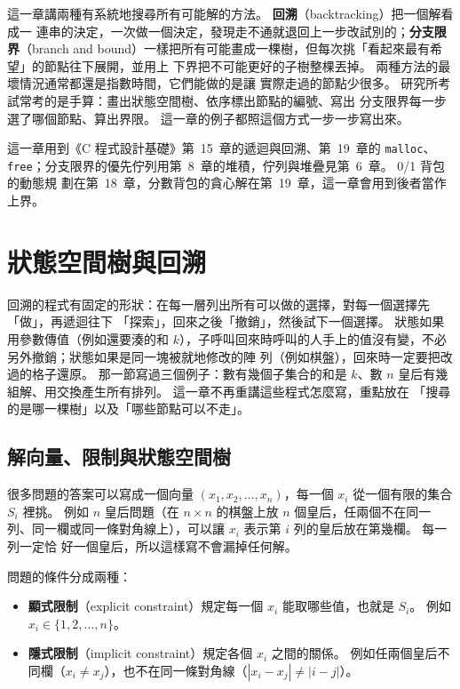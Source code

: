 這一章講兩種有系統地搜尋所有可能解的方法。 \textbf{回溯}（backtracking）把一個解看成一
連串的決定，一次做一個決定，發現走不通就退回上一步改試別的；\textbf{分支限界}（branch
and bound）一樣把所有可能畫成一棵樹，但每次挑「看起來最有希望」的節點往下展開，並用上
下界把不可能更好的子樹整棵丟掉。 兩種方法的最壞情況通常都還是指數時間，它們能做的是讓
實際走過的節點少很多。 研究所考試常考的是手算：畫出狀態空間樹、依序標出節點的編號、寫出
分支限界每一步選了哪個節點、算出界限。 這一章的例子都照這個方式一步一步寫出來。

這一章用到《C 程式設計基礎》第~15~章的遞迴與回溯、第~19~章的 \texttt{malloc}、
\texttt{free}；分支限界的優先佇列用第~8~章的堆積，佇列與堆疊見第~6~章。 0/1 背包的動態規
劃在第~18~章，分數背包的貪心解在第~19~章，這一章會用到後者當作上界。

\section{狀態空間樹與回溯}
\label{sec:bk-tree}

\begin{cbookrecap}[第~15~章 15.15 節]
回溯的程式有固定的形狀：在每一層列出所有可以做的選擇，對每一個選擇先「做」，再遞迴往下
「探索」，回來之後「撤銷」，然後試下一個選擇。 狀態如果用參數傳值（例如還要湊的和
$k$），子呼叫回來時呼叫的人手上的值沒有變，不必另外撤銷；狀態如果是同一塊被就地修改的陣
列（例如棋盤），回來時一定要把改過的格子還原。 那一節寫過三個例子：數有幾個子集合的和是
$k$、數 $n$ 皇后有幾組解、用交換產生所有排列。 這一章不再重講這些程式怎麼寫，重點放在
「搜尋的是哪一棵樹」以及「哪些節點可以不走」。
\end{cbookrecap}

\subsection{解向量、限制與狀態空間樹}

很多問題的答案可以寫成一個向量 $(x_1, x_2, \ldots, x_n)$，每一個 $x_i$ 從一個有限的集合
$S_i$ 裡挑。 例如 $n$ 皇后問題（在 $n \times n$ 的棋盤上放 $n$ 個皇后，任兩個不在同一
列、同一欄或同一條對角線上），可以讓 $x_i$ 表示第 $i$ 列的皇后放在第幾欄。 每一列一定恰
好一個皇后，所以這樣寫不會漏掉任何解。

問題的條件分成兩種：

\begin{itemize}
\item \textbf{顯式限制}（explicit constraint）規定每一個 $x_i$ 能取哪些值，也就是 $S_i$。
例如 $x_i \in \{1, 2, \ldots, n\}$。
\item \textbf{隱式限制}（implicit constraint）規定各個 $x_i$ 之間的關係。 例如任兩個皇后不
同欄（$x_i \ne x_j$），也不在同一條對角線（$|x_i - x_j| \ne |i - j|$）。
\end{itemize}

